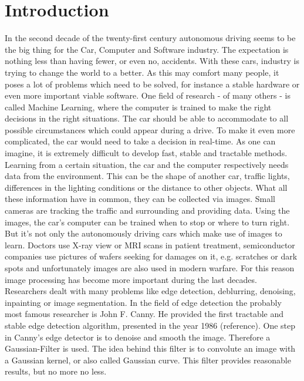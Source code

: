 \chapter{Introduction} %
\label{cha:introduction}

    In the second decade of the twenty-first century autonomous driving seems to be the big thing for the Car, Computer and Software industry. The expectation is nothing less than having fewer, or even no, accidents. With these cars, industry is trying to change the world to a better. As this may comfort many people, it poses a lot of problems which need to be solved, for instance a stable hardware or even more important viable software. One field of research - of many others - is called Machine Learning, where the computer is trained to make the right decisions in the right situations. The car should be able to accommodate to all possible circumstances which could appear during a drive. To make it even more complicated, the car would need to take a decision in real-time. As one can imagine, it is extremely difficult to develop fast, stable and tractable methods.\\
    Learning from a certain situation, the car and the computer respectively needs data from the environment. This can be the shape of another car, traffic lights, differences in the lighting conditions or the distance to other objects. What all these information have in common, they can be collected via images. Small cameras are tracking the traffic and surrounding and providing data. Using the images, the car's computer can be trained when to stop or where to turn right.\\
    But it's not only the autonomously driving cars which make use of images to learn. Doctors use X-ray view or MRI scans in patient treatment, semiconductor companies use pictures of wafers seeking for damages on it, e.g. scratches or dark spots and unfortunately images are also used in modern warfare. For this reason image processing has become more important during the last decades. Researchers dealt with many problems like edge detection, deblurring, denoising, inpainting or image segmentation. In the field of edge detection the probably most famous researcher is John F. Canny. He provided the first tractable and stable edge detection algorithm, presented in the year 1986 (reference). One step in Canny's edge detector is to denoise and smooth the image. Therefore a Gaussian-Filter is used. The idea behind this filter is to convolute an image with a Gaussian kernel, or also called Gaussian curve. This filter provides reasonable results, but no more no less.\\
